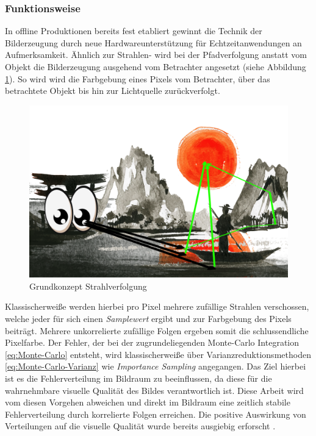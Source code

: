 \subsubsection{Funktionsweise}

In offline Produktionen bereits fest etabliert \cite{DisneyPathTracing} gewinnt die Technik
der Bilderzeugung durch neue Hardwareunterstützung für Echtzeitanwendungen an Aufmerksamkeit\cite{Sch19}.
Ähnlich zur Strahlen- wird bei der Pfadverfolgung anstatt vom Objekt die Bilderzeugung ausgehend 
vom Betrachter angesetzt (siehe Abbildung \ref{pic::GrundkonzeptPathTracing}). So wird wird die 
Farbgebung eines Pixels vom Betrachter, über das betrachtete Objekt bis hin zur Lichtquelle zurückverfolgt.

\begin{figure}[H]
    \centering
    \includegraphics[width=\linewidth]{content/PathTracer/Bilder/PathTracerGuide.png}
    \caption{Grundkonzept Strahlverfolgung}
    \label{pic::GrundkonzeptPathTracing}
\end{figure}

Klassischerweiße werden hierbei pro Pixel mehrere zufällige Strahlen verschossen, welche jeder 
für sich einen \textit{Samplewert} ergibt und zur Farbgebung des Pixels beiträgt. Mehrere
unkorrelierte zufällige Folgen ergeben somit die schlussendliche Pixelfarbe. Der Fehler, der 
bei der zugrundeliegenden Monte-Carlo Integration \ref{eq:Monte-Carlo} entsteht, wird klassischerweiße 
über Varianzreduktionsmethoden \ref{eq:Monte-Carlo-Varianz} wie \textit{Importance Sampling} angegangen.
Das Ziel hierbei ist es die Fehlerverteilung im Bildraum zu beeinflussen, da diese für die wahrnehmbare 
visuelle Qualität des Bildes verantwortlich ist. Diese Arbeit wird vom diesen Vorgehen abweichen und direkt im 
Bildraum eine zeitlich stabile 
Fehlerverteilung durch korrelierte Folgen erreichen. Die positive Auswirkung von  
Verteilungen auf die visuelle Qualität wurde bereits ausgiebig erforscht \cite{3288}.

